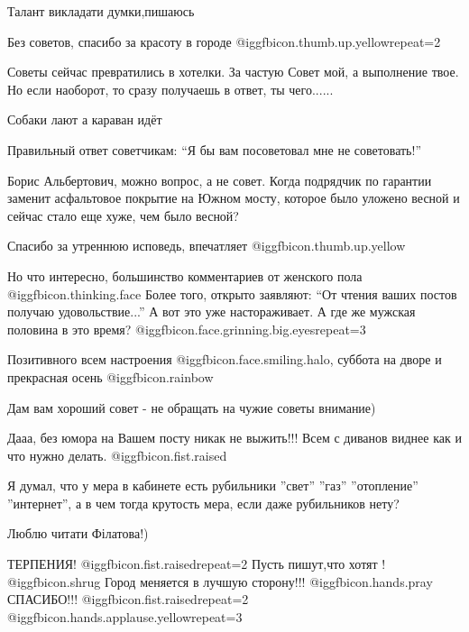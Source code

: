 \begin{itemize}
Талант викладати думки,пишаюсь

Без советов, спасибо за красоту в городе @igg{fbicon.thumb.up.yellow}{repeat=2} 


Советы сейчас превратились в хотелки. За частую Совет мой, а выполнение твое.
Но если наоборот, то сразу получаешь в ответ, ты чего......


Собаки лают а караван идёт


Правильный ответ советчикам: \enquote{Я бы вам посоветовал мне не советовать!}


Борис Альбертович, можно вопрос, а не совет. Когда подрядчик по гарантии
заменит асфальтовое покрытие на Южном мосту, которое было уложено весной и
сейчас стало еще хуже, чем было весной?


Спасибо за утреннюю исповедь, впечатляет  @igg{fbicon.thumb.up.yellow} 

Но что интересно, большинство комментариев от женского пола @igg{fbicon.thinking.face}  Более того,
открыто заявляют: \enquote{От чтения ваших постов получаю удовольствие...} А вот это
уже настораживает. А где же мужская половина в это время?  @igg{fbicon.face.grinning.big.eyes}{repeat=3} 

Позитивного всем настроения @igg{fbicon.face.smiling.halo}, суббота на дворе и прекрасная осень @igg{fbicon.rainbow} 

Дам вам хороший совет - не обращать на чужие советы внимание)

Дааа, без юмора на Вашем посту никак не выжить!!! Всем с диванов виднее как и что нужно делать. @igg{fbicon.fist.raised} 


Я думал, что у мера в кабинете есть рубильники ''свет'' ''газ'' ''отопление''
''интернет'', а в чем тогда крутость мера, если даже рубильников нету?

Люблю читати Філатова!)

ТЕРПЕНИЯ! @igg{fbicon.fist.raised}{repeat=2} Пусть пишут,что хотят !
@igg{fbicon.shrug} Город меняется в лучшую сторону!!! @igg{fbicon.hands.pray}
СПАСИБО!!! @igg{fbicon.fist.raised}{repeat=2}
@igg{fbicon.hands.applause.yellow}{repeat=3} 


\end{itemize}
